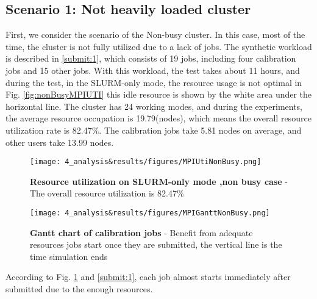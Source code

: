 \subsection{Scenario 1: Not heavily loaded cluster }
First, we consider the scenario of the Non-busy cluster. In this case, most of the time, the cluster is not fully utilized due to a lack of jobs.
The synthetic workload is described in \ref{submit:1}, which consists of 19 jobs, including four calibration jobs and 15 other jobs. 
With this workload, the test takes about  11 hours, and during the test, in the SLURM-only mode, the resource usage is not optimal in Fig. \ref{fig:nonBusyMPIUTI} this idle resource is shown by the white area under the horizontal line.
The cluster has 24 working modes, and during the experiments, the average resource occupation is 19.79(nodes), which means the overall resource utilization rate is 82.47\%.
The calibration jobs take 5.81 nodes on average, and other users take 13.99 nodes.
\begin{figure}
    \centering
    \begin{minipage}{.48\textwidth}
      \centering
      \texttt{[image: 4\_analysis\&results/figures/MPIUtiNonBusy.png]}
      \caption[Resource utilization on SLURM-only mode ,non busy case]{{\small\textbf{Resource utilization on SLURM-only mode ,non busy case} - The overall resource utilization is 82.47\%}}
      \label{fig:nonBusyMPIUTI}
    \end{minipage} 
    \begin{minipage}{.48\textwidth}
      \centering
      \texttt{[image: 4\_analysis\&results/figures/MPIGanttNonBusy.png]}
      \caption[Gantt chart of calibration jobs]{{\small\textbf{Gantt chart of calibration jobs} - Benefit from adequate resources jobs start once they are submitted, the vertical line is the time simulation ends }}
      \label{fig:nonBusyMPIgantt}
    \end{minipage}
\end{figure}
According to Fig. \ref{fig:nonBusyMPIgantt} and \ref{submit:1}, each job almost starts immediately after submitted due to the enough resources.

